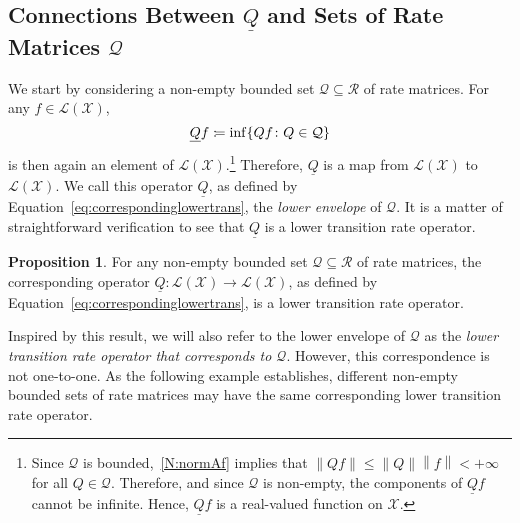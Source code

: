\documentclass[10pt]{paper}
\theoremstyle{definition}
\newtheorem{proposition}[theorem]{Proposition}
\newcommand{\states}{\mathcal{X}}
\newcommand{\gambles}{\mathcal{L}}
\newcommand{\gamblesX}{\gambles(\states)}
\newcommand{\rateset}{\mathcal{Q}}
\newcommand{\lrate}{\underline{Q}}
\newcommand{\norm}[1]{\left\lVert #1 \right\rVert}
\newcommand{\coloneqq}{:\!=}
\begin{document}
\subsection{Connections Between $\lrate$ and Sets of Rate Matrices $\rateset$}\label{sec:connections_rate}


We start by considering a non-empty bounded set $\rateset\subseteq\mathcal{R}$ of rate matrices. For any $f\in\gamblesX$,
\begin{equation}\label{eq:correspondinglowertrans}
\lrate f\coloneqq\inf\{Qf\colon Q\in\rateset\}\\[2mm]
\end{equation}
is then again an element of $\gamblesX$.\footnote{%
Since $\rateset$ is bounded,~\ref{N:normAf} implies that $\norm{Qf}\leq\norm{Q}\norm{f}<+\infty$ for all $Q\in\rateset$. Therefore, and since $\rateset$ is non-empty, the components of $\lrate f$ cannot be infinite. Hence, $\lrate f$ is a real-valued function on $\states$.}
Therefore, $\lrate$ is a map from $\gamblesX$ to $\gamblesX$. We call this operator $\lrate$, as defined by Equation~\eqref{eq:correspondinglowertrans}, the \emph{lower envelope} of $\rateset$. It is a matter of straightforward verification to see that $\lrate$ is a lower transition rate operator.

\begin{proposition}\label{prop:lowerenvelopeislowertrans}
For any non-empty bounded set $\rateset\subseteq\mathcal{R}$ of rate matrices, the corresponding operator $\lrate\colon\gamblesX\to\gamblesX$, as defined by Equation~\eqref{eq:correspondinglowertrans}, is a lower transition rate operator.
\end{proposition}

\noindent
Inspired by this result, we will also refer to the lower envelope of $\rateset$ as the \emph{lower transition rate operator that corresponds to $\rateset$}. %
However, this correspondence is not one-to-one. As the following example establishes, different non-empty bounded sets of rate matrices may have the same corresponding lower transition rate operator.
\end{document}
